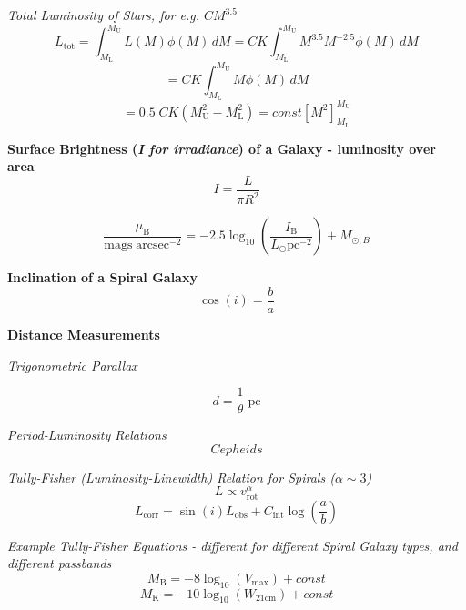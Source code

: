 \documentclass{spy}
\begin{document}
\textit {Total Luminosity of Stars, for e.g. \(CM^{3.5}\)}
\begin{equation}
L_\mathrm{tot} =  \int_{M_\mathrm{L}}^{M_\mathrm{U}} L(M) \phi(M) \,dM =  CK \int_{M_\mathrm{L}}^{M_\mathrm{U}} M^{3.5} M^{-2.5} \phi(M) \,dM 
\end{equation}
\begin{equation}
=  CK \int_{M_\mathrm{L}}^{M_\mathrm{U}} M \phi(M) \,dM
\end{equation}
\begin{equation}
= 0.5 \; CK \left( M^2_\mathrm{U} - M^2_\mathrm{L} \right) =  const \left[ M^2 \right] ^{M_\mathrm{U}}_{M_\mathrm{L}}
\end{equation}

\textbf {Surface Brightness (\textit{I for irradiance}) of a Galaxy - luminosity over area}
\begin{equation}
I = \frac{L}{\pi R^2}
\end{equation}

\begin{equation}
\frac{\mu_\mathrm{B}}{\mathrm{mags \; arcsec}^{-2}} = -2.5 \log_\mathrm{10} \left(\frac{I_\mathrm{B}}{L_\odot \mathrm{pc}^{-2}} \right) + M_{\odot, B}
\end{equation}

\textbf {Inclination of a Spiral Galaxy}
\begin{equation}
\cos(i) = \frac {b}{a}
\end{equation}

\textbf {Distance Measurements}

\textit{Trigonometric Parallax}

\begin{equation}
d = \frac {1}{\theta} \; \mathrm{pc}
\end{equation}

\textit{Period-Luminosity Relations}
\begin{equation}
Cepheids
\end{equation}

\textit {Tully-Fisher (Luminosity-Linewidth) Relation for Spirals (\(\alpha \sim 3\))}
\begin{equation}
L \propto v_\mathrm{rot}^\alpha
\end{equation}
\begin{equation}
L_\mathrm{corr} = \sin(i) L_\mathrm{obs} + C_\mathrm{int} \log \left(\frac{a}{b}\right)
\end{equation}

\textit{Example Tully-Fisher Equations - different for different Spiral Galaxy types, and different passbands}
\begin{equation}
M_\mathrm{B} = -8 \log_\mathrm{10}(V_\mathrm{max}) + const
\end{equation}
\begin{equation}
M_\mathrm{K} = -10 \log_\mathrm{10}(W_\mathrm{21cm}) + const
\end{equation}
\end{document}
